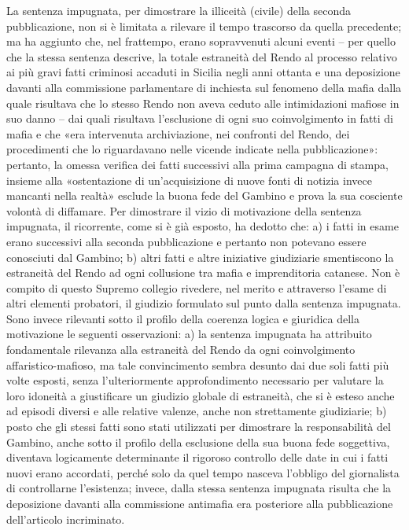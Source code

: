 La sentenza impugnata, per dimostrare la illiceità (civile) della seconda pubblicazione, non si è limitata a rilevare il tempo trascorso da quella precedente; ma ha aggiunto che, nel frattempo, erano sopravvenuti alcuni eventi – per quello che la stessa sentenza descrive, la totale estraneità del Rendo al processo relativo ai più gravi fatti criminosi accaduti in Sicilia negli anni ottanta e una deposizione davanti alla commissione parlamentare di inchiesta sul fenomeno della mafia dalla quale risultava che lo stesso Rendo non aveva ceduto alle intimidazioni mafiose in suo danno – dai quali risultava l’esclusione di ogni suo coinvolgimento in fatti di mafia e che «era intervenuta archiviazione, nei confronti del Rendo, dei procedimenti che lo riguardavano nelle vicende indicate nella pubblicazione»: pertanto, la omessa verifica dei fatti successivi alla prima campagna di stampa, insieme alla «ostentazione di un’acquisizione di nuove fonti di notizia invece mancanti nella realtà» esclude la buona fede del Gambino e prova la sua cosciente volontà di diffamare.
Per dimostrare il vizio di motivazione della sentenza impugnata, il ricorrente, come si è già esposto, ha dedotto che: a) i fatti in esame erano successivi alla seconda pubblicazione e pertanto non potevano essere conosciuti dal Gambino; b) altri fatti e altre iniziative giudiziarie smentiscono la estraneità del Rendo ad ogni collusione tra mafia e imprenditoria catanese.
Non è compito di questo Supremo collegio rivedere, nel merito e attraverso l’esame di altri elementi probatori, il giudizio formulato sul punto dalla sentenza impugnata. Sono invece rilevanti sotto il profilo della coerenza logica e giuridica della motivazione le seguenti osservazioni: a) la sentenza impugnata ha attribuito fondamentale rilevanza alla estraneità del Rendo da ogni coinvolgimento affaristico-mafioso, ma tale convincimento sembra desunto dai due soli fatti più volte esposti, senza l’ulteriormente approfondimento necessario per valutare la loro idoneità a giustificare un giudizio globale di estraneità, che si è esteso anche ad episodi diversi e alle relative valenze, anche non strettamente giudiziarie; b) posto che gli stessi fatti sono stati utilizzati per dimostrare la responsabilità del Gambino, anche sotto il profilo della esclusione della sua buona fede soggettiva, diventava logicamente determinante il rigoroso controllo delle date in cui i fatti nuovi erano accordati, perché solo da quel tempo nasceva l’obbligo del giornalista di controllarne l’esistenza; invece, dalla stessa sentenza impugnata risulta che la deposizione davanti alla commissione antimafia era posteriore alla pubblicazione dell’articolo incriminato.
